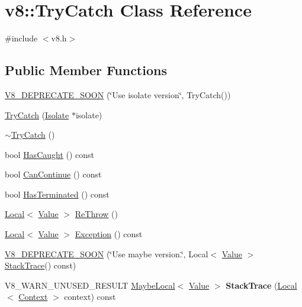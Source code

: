 \hypertarget{classv8_1_1TryCatch}{}\section{v8\+:\+:Try\+Catch Class Reference}
\label{classv8_1_1TryCatch}


{\ttfamily \#include $<$v8.\+h$>$}

\subsection*{Public Member Functions}
\begin{DoxyCompactItemize}
\item 
\hyperlink{classv8_1_1TryCatch_ae3b6a2248b687b2cbc5271fcc2e40d66}{V8\+\_\+\+D\+E\+P\+R\+E\+C\+A\+T\+E\+\_\+\+S\+O\+O\+N} (\char`\"{}Use isolate version\char`\"{}, Try\+Catch())
\item 
\hyperlink{classv8_1_1TryCatch_a623ce624491b383fae60c05d2aeefb1a}{Try\+Catch} (\hyperlink{classv8_1_1Isolate}{Isolate} $\ast$isolate)
\item 
\hyperlink{classv8_1_1TryCatch_a2c9ad4b40d17dd31c6dd020736b30679}{$\sim$\+Try\+Catch} ()
\item 
bool \hyperlink{classv8_1_1TryCatch_a48f704fbf2b82564b5d2a4ff596e4137}{Has\+Caught} () const 
\item 
bool \hyperlink{classv8_1_1TryCatch_a2ec467d4653d26c064d749cab98791cb}{Can\+Continue} () const 
\item 
bool \hyperlink{classv8_1_1TryCatch_a7e012477ac47db9480f85d55427987c7}{Has\+Terminated} () const 
\item 
\hyperlink{classv8_1_1Local}{Local}$<$ \hyperlink{classv8_1_1Value}{Value} $>$ \hyperlink{classv8_1_1TryCatch_ab8c3a1dbb38e6fd00e37436034daf707}{Re\+Throw} ()
\item 
\hyperlink{classv8_1_1Local}{Local}$<$ \hyperlink{classv8_1_1Value}{Value} $>$ \hyperlink{classv8_1_1TryCatch_a99c425f29b3355b4294cbe762377f99b}{Exception} () const 
\item 
\hyperlink{classv8_1_1TryCatch_a40bb49f0c8ee86f948cb0a172d7d4b74}{V8\+\_\+\+D\+E\+P\+R\+E\+C\+A\+T\+E\+\_\+\+S\+O\+O\+N} (\char`\"{}Use maybe version.\char`\"{}, Local$<$ \hyperlink{classv8_1_1Value}{Value} $>$ \hyperlink{classv8_1_1StackTrace}{Stack\+Trace}() const)
\item 
\hypertarget{classv8_1_1TryCatch_a449fe4cdc063d234f2bea39e9297ba28}{}V8\+\_\+\+W\+A\+R\+N\+\_\+\+U\+N\+U\+S\+E\+D\+\_\+\+R\+E\+S\+U\+L\+T \hyperlink{classv8_1_1MaybeLocal}{Maybe\+Local}$<$ \hyperlink{classv8_1_1Value}{Value} $>$ {\bfseries Stack\+Trace} (\hyperlink{classv8_1_1Local}{Local}$<$ \hyperlink{classv8_1_1Context}{Context} $>$ context) const \label{classv8_1_1TryCatch_a449fe4cdc063d234f2bea39e9297ba28}


\end{DoxyCompactItemize}
